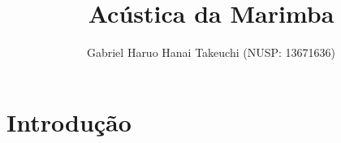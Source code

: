 \documentclass[12pt]{article}
\title{Acústica da Marimba}
\author{Gabriel Haruo Hanai Takeuchi (NUSP: 13671636)}
\date{}
\begin{document}
\maketitle

\section{Introdução}



\end{document}
